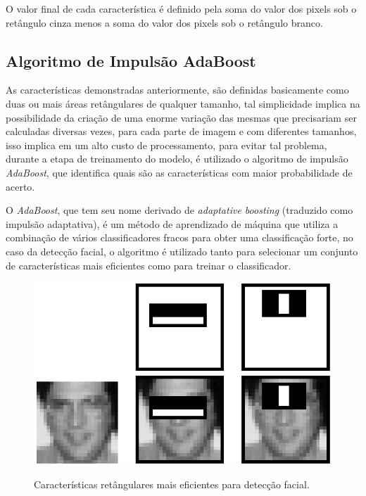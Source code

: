  O valor final de cada característica é definido pela soma do valor dos pixels sob o retângulo cinza menos a soma do valor dos pixels sob o retângulo branco.

\subsection{Algoritmo de Impulsão AdaBoost}

As características demonstradas anteriormente, são definidas basicamente como duas ou mais áreas retângulares de qualquer tamanho, tal simplicidade implica na possibilidade da criação de uma enorme variação das mesmas que precisariam ser calculadas diversas vezes, para cada parte de imagem e com diferentes tamanhos, isso implica em um alto custo de processamento, para evitar tal problema, durante a etapa de treinamento do modelo, é utilizado o algoritmo de impulsão \textit{AdaBoost}, que identifica quais são as características com maior probabilidade de acerto.

O \textit{AdaBoost}, que tem seu nome derivado de \textit{adaptative boosting} (traduzido como impulsão adaptativa), é um método de aprendizado de máquina que utiliza a combinação de vários classificadores fracos para obter uma classificação forte, no caso da detecção facial, o algoritmo é utilizado tanto para selecionar um conjunto de características mais eficientes como para treinar o classificador. \cite{fabio-luciana-2015}

\begin{figure}[htb]
    \centering
    \caption{Características retângulares mais eficientes para detecção facial.}
    \includegraphics[scale=.4]{figs/top-features.png}
    \label{fig:top-features}
 \end{figure}

